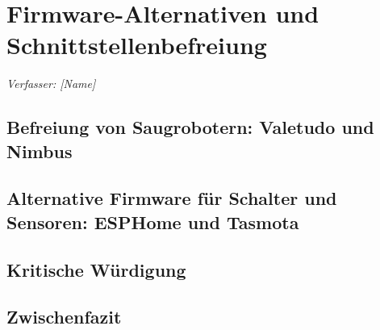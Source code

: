 \chapter{Firmware-Alternativen und Schnittstellenbefreiung}\label{chap:firmware-alternativen}
\noindent\textit{Verfasser: [Name]}


\section{Befreiung von Saugrobotern: Valetudo und Nimbus}\label{sec:firmware-saugroboter}

\section{Alternative Firmware für Schalter und Sensoren: ESPHome und Tasmota}\label{sec:firmware-esp}

\section{Kritische Würdigung}\label{sec:firmware-kritik}

\section{Zwischenfazit}\label{sec:firmware-zwischenfazit}
